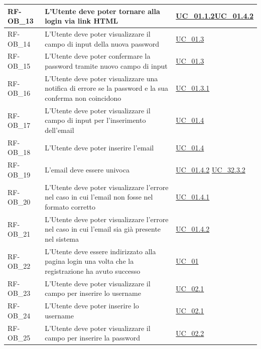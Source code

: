 \begin{longtable}{|>{\raggedright}p{}|>{\raggedright\arraybackslash}p{}|>{\raggedright\arraybackslash}p{}|}
	\hline
	RF-OB\_13 \hypertarget{rf-ob_13} & L'Utente deve poter tornare alla login via link HTML & \hyperref[uc_01.1.2]{UC\_01.1.2}\newline \hyperref[uc_01.4.2]{UC\_01.4.2} \\
	\hline
	RF-OB\_14 \hypertarget{rf-ob_14} & L'Utente deve poter visualizzare il campo di input della nuova password & \hyperref[uc_01.3]{UC\_01.3} \\
	\hline
	RF-OB\_15 \hypertarget{rf-ob_15} & L'Utente deve poter confermare la password tramite nuovo campo di input & \hyperref[uc_01.3]{UC\_01.3} \\
	\hline
	RF-OB\_16 \hypertarget{rf-ob_16} & L'Utente deve poter visualizzare una notifica di errore se la password e la sua conferma non coincidono & \hyperref[uc_01.3.1]{UC\_01.3.1} \\
	\hline
	RF-OB\_17 \hypertarget{rf-ob_17} & L'Utente deve poter visualizzare il campo di input per l'inserimento dell'email & \hyperref[uc_01.4]{UC\_01.4} \\
	\hline
	RF-OB\_18 \hypertarget{rf-ob_18} & L'Utente deve poter inserire l'email & \hyperref[uc_01.4]{UC\_01.4} \\
	\hline
	RF-OB\_19 \hypertarget{rf-ob_19} & L'email deve essere univoca & \hyperref[uc_01.4.2]{UC\_01.4.2} \newline \hyperref[uc_32.3.2]{UC\_32.3.2} \\
	\hline
	RF-OB\_20 \hypertarget{rf-ob_20} & L'Utente deve poter visualizzare l'errore nel caso in cui l'email non fosse nel formato corretto & \hyperref[uc_01.4.1]{UC\_01.4.1} \\
	\hline
	RF-OB\_21 \hypertarget{rf-ob_21} & L'Utente deve poter visualizzare l'errore nel caso in cui l'email sia già presente nel sistema & \hyperref[uc_01.4.2]{UC\_01.4.2} \\
	\hline
	RF-OB\_22 \hypertarget{rf-ob_22} & L'Utente deve essere indirizzato alla pagina login una volta che la registrazione ha avuto successo & \hyperref[uc_01]{UC\_01} \\
	\hline
	RF-OB\_23 \hypertarget{rf-ob_23} & L'Utente deve poter visualizzare il campo per inserire lo username & \hyperref[uc_02.1]{UC\_02.1} \\
	\hline
	RF-OB\_24 \hypertarget{rf-ob_24} & L'Utente deve poter inserire lo username & \hyperref[uc_02.1]{UC\_02.1} \\
	\hline
	RF-OB\_25 \hypertarget{rf-ob_25} & L'Utente deve poter visualizzare il campo per inserire la password & \hyperref[uc_02.2]{UC\_02.2} \\

\end{longtable}
